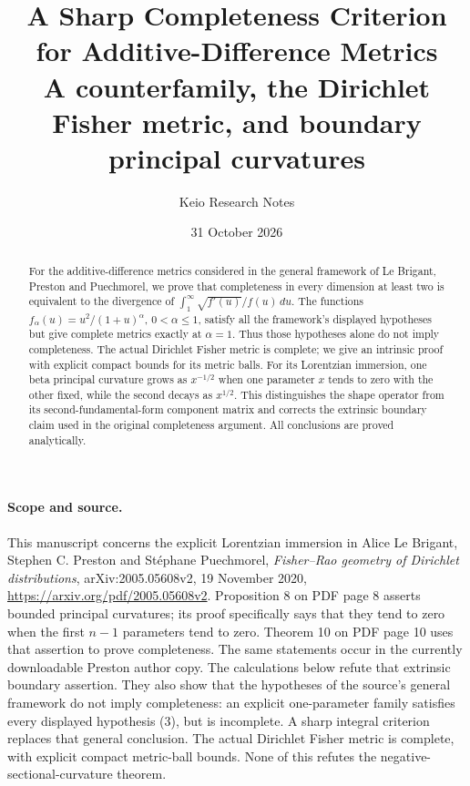 \documentclass[11pt,a4paper]{article}
\begin{document}
\title{A Sharp Completeness Criterion for Additive-Difference Metrics\\[4pt]\large A counterfamily, the Dirichlet Fisher metric, and boundary principal curvatures}
\author{Keio Research Notes}
\date{31 October 2026}
\maketitle

\begin{abstract}
For the additive-difference metrics considered in the general framework
of Le Brigant, Preston and Puechmorel, we prove that completeness in every
dimension at least two is equivalent to the divergence of
$\int_1^\infty\sqrt{f'(u)}/f(u)\,du$.
The functions $f_\alpha(u)=u^2/(1+u)^\alpha$, $0<\alpha\le1$, satisfy
all the framework's displayed hypotheses but give complete metrics
exactly at $\alpha=1$. Thus those hypotheses alone do not imply
completeness. The actual Dirichlet Fisher metric is complete; we give
an intrinsic proof with explicit compact bounds for its metric balls.
For its Lorentzian immersion, one beta principal curvature grows as
$x^{-1/2}$ when one parameter $x$ tends to zero with the other fixed,
while the second decays as $x^{1/2}$. This distinguishes the shape
operator from its second-fundamental-form component matrix and corrects
the extrinsic boundary claim used in the original completeness argument.
All conclusions are proved analytically.
\end{abstract}

\paragraph{Scope and source.}
This manuscript concerns the explicit Lorentzian immersion in Alice Le Brigant,
Stephen C. Preston and St\'ephane Puechmorel, \emph{Fisher--Rao geometry of
Dirichlet distributions}, arXiv:2005.05608v2, 19 November 2020,
\url{https://arxiv.org/pdf/2005.05608v2}.
Proposition 8 on PDF page 8 asserts bounded principal curvatures; its proof
specifically says that they tend to zero when the first $n-1$ parameters
tend to zero. Theorem 10 on PDF page 10 uses that assertion to prove
completeness. The same statements occur in the currently downloadable
Preston author copy. The calculations below refute that extrinsic
boundary assertion. They also show that the hypotheses of the source's
general framework do not imply completeness: an explicit one-parameter
family satisfies every displayed hypothesis (3), but is incomplete.
A sharp integral criterion replaces that general conclusion.
The actual Dirichlet Fisher metric is complete, with explicit compact
metric-ball bounds. None of this refutes the negative-sectional-curvature
theorem.
\end{document}
